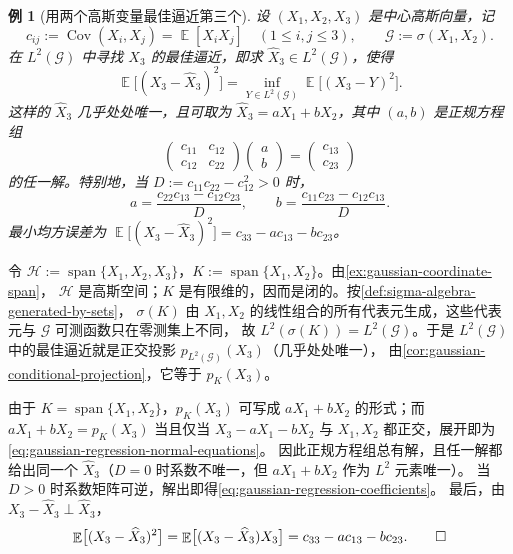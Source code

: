 \documentclass[UTF8,11pt,a4paper,oneside,fontset=fandol]{ctexrep}
\makeatletter
\numberwithin{equation}{section}
\theoremstyle{zhthm}
\newtheorem{example}[theorem]{例}
\renewenvironment{proof}[1][\proofname]{\par
  \pushQED{\qed}%
  \normalfont\topsep6\p@\@plus6\p@\relax
  \trivlist
  \item[\hskip\labelsep\bfseries#1\hspace{0.5em}]\ignorespaces
}{%
  \popQED\endtrivlist\@endpefalse
}
\renewcommand{\proofname}{证明}
\newcommand{\G}{\mathcal{G}}
\newcommand{\Hcal}{\mathcal{H}}
\DeclareMathOperator{\E}{\mathbb{E}}
\DeclareMathOperator{\Cov}{Cov}
\DeclareMathOperator{\Span}{span}
\makeatother
\begin{document}
\begin{example}[用两个高斯变量最佳逼近第三个]
\label{ex:gaussian-best-l2-approximation}
设 $(X_1,X_2,X_3)$ 是中心高斯向量，记
\[
  c_{ij}:=\Cov(X_i,X_j)=\E[X_iX_j]\quad(1\le i,j\le3),\qquad \G:=\sigma(X_1,X_2).
\]
在 $L^2(\G)$ 中寻找 $X_3$ 的最佳逼近，即求 $\widehat X_3\in L^2(\G)$，使得
\[
  \E\bigl[(X_3-\widehat X_3)^2\bigr]=\inf_{Y\in L^2(\G)}\E\bigl[(X_3-Y)^2\bigr].
\]
这样的 $\widehat X_3$ 几乎处处唯一，且可取为 $\widehat X_3=aX_1+bX_2$，其中 $(a,b)$ 是正规方程组
\begin{equation}
  \label{eq:gaussian-regression-normal-equations}
  \begin{pmatrix}c_{11}&c_{12}\\c_{12}&c_{22}\end{pmatrix}
  \begin{pmatrix}a\\b\end{pmatrix}
  =\begin{pmatrix}c_{13}\\c_{23}\end{pmatrix}
\end{equation}
的任一解。特别地，当 $D:=c_{11}c_{22}-c_{12}^2>0$ 时，
\begin{equation}
  \label{eq:gaussian-regression-coefficients}
  a=\frac{c_{22}c_{13}-c_{12}c_{23}}{D},\qquad
  b=\frac{c_{11}c_{23}-c_{12}c_{13}}{D}.
\end{equation}
最小均方误差为 $\E\bigl[(X_3-\widehat X_3)^2\bigr]=c_{33}-ac_{13}-bc_{23}$。
\end{example}

\begin{proof}
令 $\Hcal:=\Span\{X_1,X_2,X_3\}$，$K:=\Span\{X_1,X_2\}$。由\cref{ex:gaussian-coordinate-span}，
$\Hcal$ 是高斯空间；$K$ 是有限维的，因而是闭的。按\cref{def:sigma-algebra-generated-by-sets}，
$\sigma(K)$ 由 $X_1,X_2$ 的线性组合的所有代表元生成，这些代表元与 $\G$ 可测函数只在零测集上不同，
故 $L^2(\sigma(K))=L^2(\G)$。于是 $L^2(\G)$ 中的最佳逼近就是正交投影 $p_{L^2(\G)}(X_3)$（几乎处处唯一），
由\cref{cor:gaussian-conditional-projection}，它等于 $p_K(X_3)$。

由于 $K=\Span\{X_1,X_2\}$，$p_K(X_3)$ 可写成 $aX_1+bX_2$ 的形式；而 $aX_1+bX_2=p_K(X_3)$ 当且仅当
$X_3-aX_1-bX_2$ 与 $X_1,X_2$ 都正交，展开即为\cref{eq:gaussian-regression-normal-equations}。
因此正规方程组总有解，且任一解都给出同一个 $\widehat X_3$（$D=0$ 时系数不唯一，但 $aX_1+bX_2$ 作为 $L^2$ 元素唯一）。
当 $D>0$ 时系数矩阵可逆，解出即得\cref{eq:gaussian-regression-coefficients}。
最后，由 $X_3-\widehat X_3\perp\widehat X_3$，
\[
  \E\bigl[(X_3-\widehat X_3)^2\bigr]=\E\bigl[(X_3-\widehat X_3)X_3\bigr]=c_{33}-ac_{13}-bc_{23}.\qedhere
\]
\end{proof}
\end{document}
